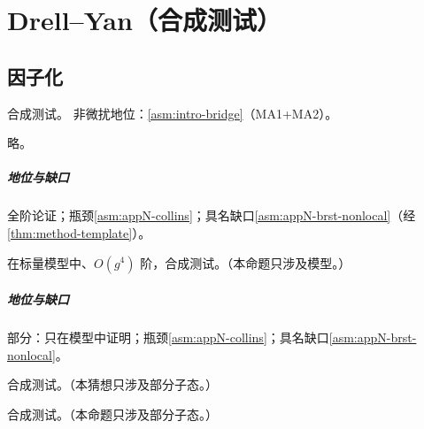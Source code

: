 \chapter{Drell--Yan（合成测试）}\label{ch:dy}

\section{因子化}\label{sec:dy-fact}

\begin{theorem}\label{thm:dy-factorization}
合成测试。
非微扰地位：\cref{asm:intro-bridge}（MA1+MA2）。
\end{theorem}
\begin{proofsketch}略。\end{proofsketch}

\paragraph{地位与缺口}全阶论证；瓶颈\cref{asm:appN-collins}；具名缺口\cref{asm:appN-brst-nonlocal}（经\cref{thm:method-template}）。

\begin{proposition}\label{prop:dy-model}
在标量模型中、$O(g^4)$ 阶，合成测试。（本命题只涉及模型。）
\end{proposition}

\paragraph{地位与缺口}部分：只在模型中证明；瓶颈\cref{asm:appN-collins}；具名缺口\cref{asm:appN-brst-nonlocal}。

\begin{conjecture}\label{conj:dy-coloured}
合成测试。（本猜想只涉及部分子态。）
\end{conjecture}

\begin{proposition}\label{prop:dy-late}
合成测试。（本命题只涉及部分子态。）
\end{proposition}

